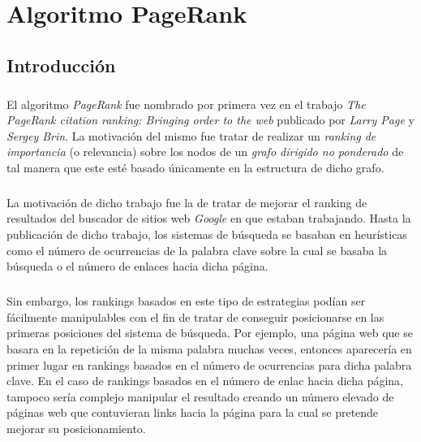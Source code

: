 \documentclass{subfiles}
\begin{document}
  \chapter{Algoritmo PageRank}
  \label{chap:pagerank}

    \section{Introducción}
    \label{sec:pagerank_intro}

      \paragraph{}
      El algoritmo \emph{PageRank} fue nombrado por primera vez en el trabajo \emph{The PageRank citation ranking: Bringing order to the web} \cite{page1999pagerank} publicado por \emph{Larry Page} y \emph{Sergey Brin}. La motivación del mismo fue tratar de realizar un \emph{ranking de importancia} (o relevancia) sobre los nodos de un \emph{grafo dirigido no ponderado} de tal manera que este esté basado únicamente en la estructura de dicho grafo.

      \paragraph{}
      La motivación de dicho trabajo fue la de tratar de mejorar el ranking de resultados del buscador de sitios web \emph{Google} en que estaban trabajando. Hasta la publicación de dicho trabajo, los sistemas de búsqueda se basaban en heurísticas como el número de ocurrencias de la palabra clave sobre la cual se basaba la búsqueda o el número de enlaces hacia dicha página.

      \paragraph{}
      Sin embargo, los rankings basados en este tipo de estrategias podían ser fácilmente manipulables con el fin de tratar de conseguir posicionarse en las primeras posiciones del sistema de búsqueda. Por ejemplo, una página web que se basara en la repetición de la misma palabra muchas veces, entonces aparecería en primer lugar en rankings basados en el número de ocurrencias para dicha palabra clave. En el caso de rankings basados en el número de enlac hacia dicha página, tampoco sería complejo manipular el resultado creando un número elevado de páginas web que contuvieran links hacia la página para la cual se pretende mejorar su posicionamiento.
\end{document}

